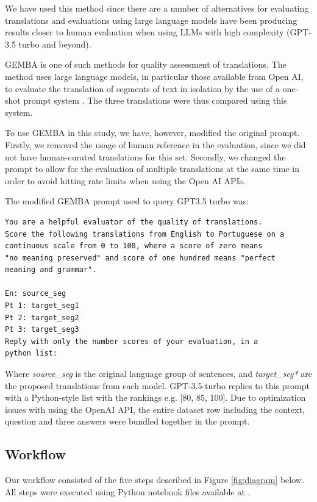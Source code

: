 \documentclass[runningheads]{llncs}
\begin{document}
We have used this method since there are a number of alternatives for evaluating translations \cite{lee2023survey} and evaluations using large language models have been producing results closer to human evaluation when using LLMs with high complexity (GPT-3.5 turbo and beyond).

GEMBA is one of such methods for quality assessment of translations. The method uses large language models, in particular those available from Open AI, to evaluate the translation of segments of text in isolation by the use of a one-shot prompt system \cite{kocmi2023large}. The three translations were thus compared using this system.

To use GEMBA in this study, we have, however, modified the original prompt. Firstly, we removed the usage of human reference in the evaluation, since we did not have human-curated translations for this set.
Secondly, we changed the prompt to allow for the evaluation of multiple translations at the same time in order to avoid hitting rate limits when using the Open AI APIs.

The modified GEMBA prompt used to query GPT3.5 turbo was:

\begin{framed}
\begin{verbatim}
You are a helpful evaluator of the quality of translations.
Score the following translations from English to Portuguese on a
continuous scale from 0 to 100, where a score of zero means
"no meaning preserved" and score of one hundred means "perfect
meaning and grammar".

En: source_seg
Pt 1: target_seg1
Pt 2: target_seg2
Pt 3: target_seg3
Reply with only the number scores of your evaluation, in a 
python list:
\end{verbatim}
\end{framed}

Where \emph{source\_seg} is the original language group of sentences, and
\emph{target\_seg*} are the proposed translations from each model. GPT-3.5-turbo
replies to this prompt with a Python-style list with the rankings e.g. [80, 85,
100]. Due to optimization issues with using the OpenAI API, the entire dataset
row including the context, question and three answers were bundled together in
the prompt.

\subsection{Workflow}
Our workflow consisted of the five steps described in Figure
\ref{fig:diagram} below. All steps were executed using Python notebook files
available at \cite{socialiqa_pt_impl}.
\end{document}
